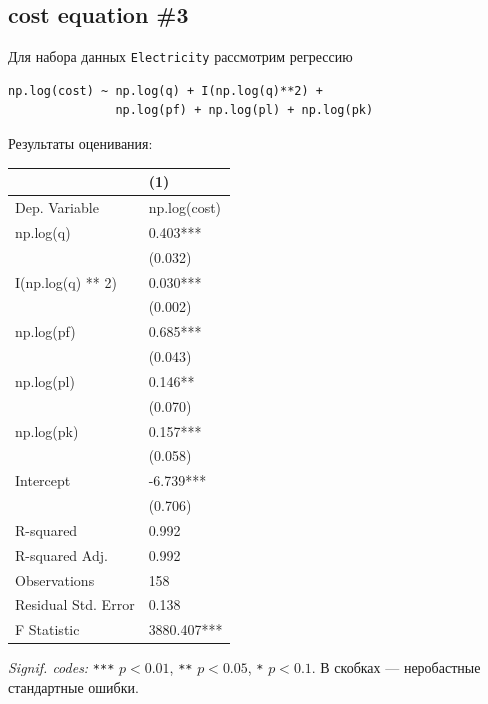 \documentclass[
  russian,
]{article}
\newcounter{none} %
\begin{document}
\subsection{cost equation \#3}\label{cost-equation-3}

Для набора данных \texttt{Electricity} рассмотрим регрессию

\begin{verbatim}
np.log(cost) ~ np.log(q) + I(np.log(q)**2) +
               np.log(pf) + np.log(pl) + np.log(pk)
\end{verbatim}

Результаты оценивания:

{\def\LTcaptype{none} %
\begin{longtable}[]{@{}ll@{}}
\toprule\noalign{}
& (1) \\
\midrule\noalign{}
\endhead
\bottomrule\noalign{}
\endlastfoot
Dep. Variable & np.log(cost) \\
np.log(q) & 0.403*** \\
& (0.032) \\
I(np.log(q) ** 2) & 0.030*** \\
& (0.002) \\
np.log(pf) & 0.685*** \\
& (0.043) \\
np.log(pl) & 0.146** \\
& (0.070) \\
np.log(pk) & 0.157*** \\
& (0.058) \\
Intercept & -6.739*** \\
& (0.706) \\
R-squared & 0.992 \\
R-squared Adj. & 0.992 \\
Observations & 158 \\
Residual Std. Error & 0.138 \\
F Statistic & 3880.407*** \\
\end{longtable}
}

\emph{Signif. codes:} \texttt{***} \(p<0.01\), \texttt{**} \(p<0.05\),
\texttt{*} \(p<0.1\). В скобках --- неробастные стандартные ошибки.
\end{document}

